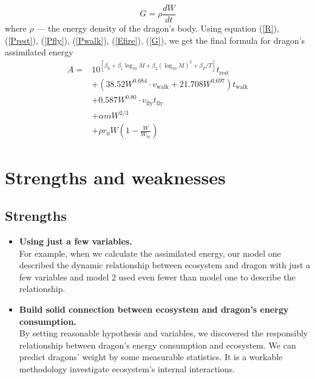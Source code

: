 \documentclass{mcmthesis}
\begin{document}
\begin{equation}
\label{G}
G=\rho\frac{dW}{dt}
\end{equation}
where $\rho$ --- the energy density of the dragon's body.
Using equation (\ref{R}), (\ref{Prest}), (\ref{Pfly}), (\ref{Pwalk}), (\ref{Efire}), (\ref{G}), we get the final formula for dragon's assimilated energy
\begin{align}
A=&10^{[\beta_0+\beta_1\log_{10}M+\beta_2(\log_{10}M)^2+\beta_T/T]}t_{\text{rest}}\\&+(38.52W^{0.684}\cdot v_{\text{walk}}+21.708W^{0.697})t_{\text{walk}}\\
&+0.587W^{0.80}\cdot v_{\text{fly}}t_{\text{fly}}\\
&+\alpha mW^{2/3}\\
&+\rho r_0W(1-\frac{W}{W_m})
\end{align}
%

\section{Strengths and weaknesses}
\subsection{Strengths}
\begin{itemize}
\item \textbf{Using just a few variables.}\\
For example, when we calculate the assimilated energy, our model one described the dynamic relationship between ecosystem and dragon with just a few variables and model 2 used even fewer than model one to describe the relationship.
\item \textbf{Build solid connection between ecosystem and dragon’s energy consumption.}\\
By setting reasonable hypothesis and variables, we discovered the responsibly relationship between dragon’s energy consumption and ecosystem. We can predict dragons’ weight by some measurable statistics. It is a workable methodology investigate ecosystem’s internal interactions.
\end{itemize}
\end{document}
